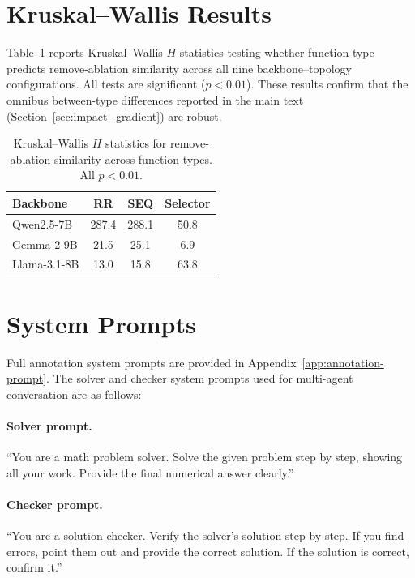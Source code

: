 \section{Kruskal--Wallis Results}
\label{app:kw}

Table~\ref{tab:kruskal_wallis} reports Kruskal--Wallis $H$ statistics testing whether function type predicts remove-ablation similarity across all nine backbone--topology configurations. All tests are significant ($p < 0.01$). These results confirm that the omnibus between-type differences reported in the main text (Section~\ref{sec:impact_gradient}) are robust.

\begin{table}[htbp]
\centering
\caption{Kruskal--Wallis $H$ statistics for remove-ablation similarity across function types. All $p < 0.01$.}
\label{tab:kruskal_wallis}
\small
\begin{tabular}{lccc}
\toprule
\textbf{Backbone} & \textbf{RR} & \textbf{SEQ} & \textbf{Selector} \\
\midrule
Qwen2.5-7B  & 287.4 & 288.1 & 50.8 \\
Gemma-2-9B  & 21.5 & 25.1 & 6.9 \\
Llama-3.1-8B & 13.0 & 15.8 & 63.8 \\
\bottomrule
\end{tabular}
\end{table}

\section{System Prompts}
\label{app:system-prompts}

Full annotation system prompts are provided in Appendix~\ref{app:annotation-prompt}. The solver and checker system prompts used for multi-agent conversation are as follows:

\paragraph{Solver prompt.} ``You are a math problem solver. Solve the given problem step by step, showing all your work. Provide the final numerical answer clearly.''

\paragraph{Checker prompt.} ``You are a solution checker. Verify the solver's solution step by step. If you find errors, point them out and provide the correct solution. If the solution is correct, confirm it.''


